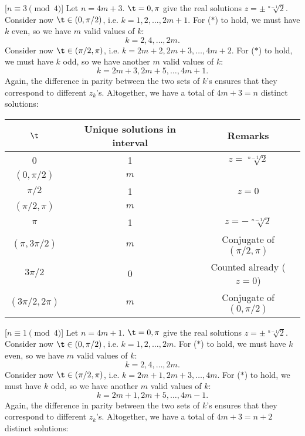 \begin{solution}
    [$n \equiv 3 \pmod{4}$] Let $n = 4m + 3$. $\t = 0, \pi$ give the real solutions $z = \pm \sqrt[n-1]{2}$. Consider now $\t \in (0, \pi/2)$, i.e. $k = 1, 2, \dots, 2m+1$. For ($\ast$) to hold, we must have $k$ even, so we have $m$ valid values of $k$: \[k = 2, 4, \dots, 2m.\] Consider now $\t \in (\pi/2, \pi)$, i.e. $k = 2m+2, 2m+3, \dots, 4m+2$. For ($\ast$) to hold, we must have $k$ odd, so we have another $m$ valid values of $k$: \[k = 2m+3, 2m+5, \dots, 4m+1.\] Again, the difference in parity between the two sets of $k$'s ensures that they correspond to different $z_k$'s. Altogether, we have a total of $4m+3 = n$ distinct solutions:

    \begin{table}[H]
        \centering
        \begin{tabular}{|c|c|c|}
        \hline
        $\t$ & Unique solutions in interval & Remarks \\ \hline\hline
        0 & 1 & $z = \sqrt[n-1]{2}$ \\ \hline
        $(0, \pi/2)$ & $m$ &  \\ \hline
        $\pi/2$ & 1 & $z = 0$ \\ \hline
        $(\pi/2, \pi)$ & $m$ &  \\ \hline
        $\pi$ & 1 & $z = -\sqrt[n-1]{2}$ \\ \hline
        $(\pi, 3\pi/2)$ & $m$ &  Conjugate of $(\pi/2, \pi)$\\ \hline
        $3\pi/2$ & 0 & Counted already ($z = 0$) \\ \hline
        $(3\pi/2, 2\pi)$ & $m$ & Conjugate of $(0, \pi/2)$ \\ \hline
        \end{tabular}
    \end{table}

    [$n \equiv 1 \pmod{4}$] Let $n = 4m + 1$. $\t = 0, \pi$ give the real solutions $z = \pm \sqrt[n-1]{2}$. Consider now $\t \in (0, \pi/2)$, i.e. $k = 1, 2, \dots, 2m$. For ($\ast$) to hold, we must have $k$ even, so we have $m$ valid values of $k$: \[k = 2, 4, \dots, 2m.\] Consider now $\t \in (\pi/2, \pi)$, i.e. $k = 2m+1, 2m+3, \dots, 4m$. For ($\ast$) to hold, we must have $k$ odd, so we have another $m$ valid values of $k$: \[k = 2m+1, 2m+5, \dots, 4m-1.\] Again, the difference in parity between the two sets of $k$'s ensures that they correspond to different $z_k$'s. Altogether, we have a total of $4m+3 = n+2$ distinct solutions:


\end{solution}
